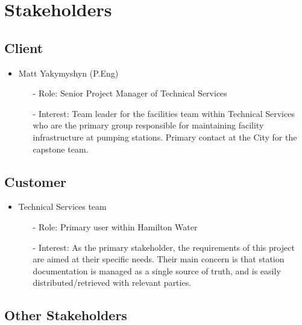 \documentclass[12pt]{article}
\begin{document}
\section{Stakeholders}
\subsection{Client}

\begin{itemize}
  \item Matt Yakymyshyn (P.Eng)
    \begin{itemize}
      \item[-] Role: Senior Project Manager of Technical Services
      \item[-] Interest: Team leader for the facilities team within
        Technical Services who are the primary group responsible for
        maintaining facility infrastructure at pumping stations.
        Primary contact at the City for the capstone team.
    \end{itemize}
\end{itemize}

\subsection{Customer}

\begin{itemize}
  \item Technical Services team
    \begin{itemize}
      \item[-] Role: Primary user within Hamilton Water
      \item[-] Interest: As the primary stakeholder, the requirements
        of this project are aimed at their specific needs. Their main concern
        is that station documentation is managed as a single source of truth,
        and is easily distributed/retrieved with relevant parties.
    \end{itemize}
\end{itemize}
\subsection{Other Stakeholders}
\end{document}
